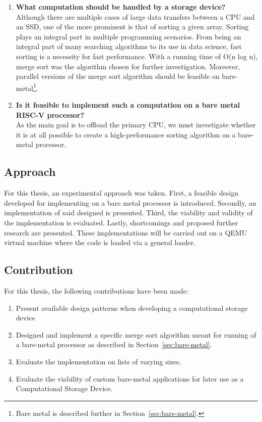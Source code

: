 \begin{enumerate}
  \item {\large \textbf{What computation should be handled by a storage
    device?}}\label{sec:computational} \\
    Although there are multiple cases of large data transfers between a CPU and
    an SSD, one of the more prominent is that of sorting a given array. Sorting
    plays an integral part in multiple programming scenarios. From being an
    integral part of many searching algorithms to its use in data science, fast
    sorting is a necessity for fast performance. With a running time of O(n log
    n), merge sort was the algorithm chosen for further investigation. Moreover,
    parallel versions of the merge sort algorithm should be feasible on
    bare-metal\footnote{Bare metal is described further in
    Section~\ref{sec:bare-metal}.}.
  \item {\large \textbf{ Is it feasible to implement such a computation on a
    bare metal RISC-V processor?}} \\
    As the main goal is to offload the primary CPU, we must investigate whether
    it is at all possible to create a high-performance sorting algorithm on a
    bare-metal processor.
\end{enumerate}


\subsection{Approach}\label{sec:approach}
For this thesis, an experimental approach was taken. First, a feasible design
developed for implementing on a bare metal processor is introduced. Secondly, an
implementation of said designed is presented. Third, the viability and validity
of the implementation is evaluated. Lastly, shortcomings and proposed further
research are presented. These implementations will be carried out on a QEMU
virtual machine where the code is loaded via a general loader.

\subsection{Contribution}
For this thesis, the following contributions have been made:
\begin{enumerate}
  \item Present available design patterns when developing a computational
    storage device
  \item Designed and implement a specific merge sort algorithm meant for running of a
    bare-metal processor as described in Section~\ref{sec:bare-metal}.
  \item Evaluate the implementation on lists of varying sizes.
  \item Evaluate the viability of custom bare-metal applications for later use
    as a Computational Storage Device.
\end{enumerate}


